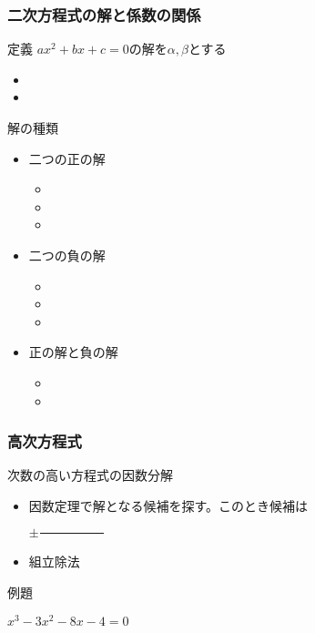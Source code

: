 \documentclass[10pt,dvipdfmx]{jsarticle}
\begin{document}
\subsubsection*{二次方程式の解と係数の関係}
定義
$ax^2+bx+c=0$の解を$\alpha,\beta$とする
\begin{multicols}{2}
  \begin{itemize}
    \item \item
  \end{itemize}
\end{multicols}

解の種類
\begin{multicols}{3}
  \begin{large}
    \begin{itemize}
      \item 二つの正の解
            \begin{itemize}
              \item \item \item
            \end{itemize}
      \item 二つの負の解
            \begin{itemize}
              \item \item \item
            \end{itemize}
      \item 正の解と負の解
            \begin{itemize}
              \item \item
            \end{itemize}
    \end{itemize}
  \end{large}
\end{multicols}

\subsubsection*{高次方程式}
\begin{itembox}[l]{次数の高い方程式の因数分解}
  \begin{itemize}
    \item 因数定理で解となる候補を探す。このとき候補は\begin{Large}$\pm\frac{\hspace{3cm}}{\hspace{3cm}}$\end{Large}
    \item 組立除法
  \end{itemize}
\end{itembox}
\begin{itembox}[l]{例題}
  \begin{large}
    $x^3-3x^2-8x-4=0$
  \end{large}
  \vspace{2cm}
\end{itembox}
\end{document}
